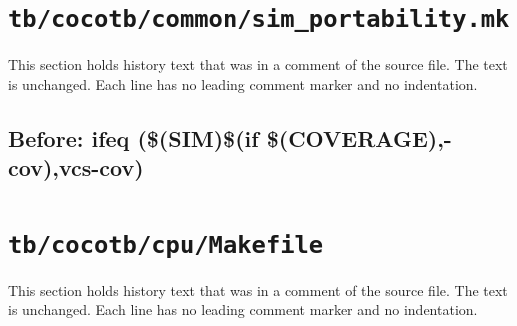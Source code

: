 \section{\texttt{tb/cocotb/common/sim\_portability.mk}}\label{cr:suite:common-sim-portability-mk}

This section holds history text that was in a comment of the source file. The text is unchanged. Each line has no leading comment marker and no indentation.

\begin{record}

\subsection*{Before: ifeq (\$(SIM)\$(if \$(COVERAGE),-cov),vcs-cov)}


\end{record}

\section{\texttt{tb/cocotb/cpu/Makefile}}\label{cr:suite:cpu-makefile}

This section holds history text that was in a comment of the source file. The text is unchanged. Each line has no leading comment marker and no indentation.

